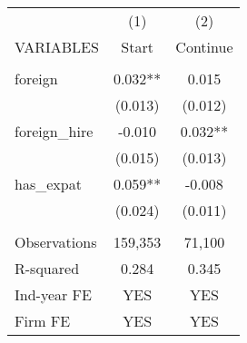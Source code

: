 \begin{tabular}{lcc} \hline
 & (1) & (2) \\
VARIABLES & Start & Continue \\ \hline
 &  &  \\
foreign & 0.032** & 0.015 \\
 & (0.013) & (0.012) \\
foreign\_hire & -0.010 & 0.032** \\
 & (0.015) & (0.013) \\
has\_expat & 0.059** & -0.008 \\
 & (0.024) & (0.011) \\
 &  &  \\
Observations & 159,353 & 71,100 \\
R-squared & 0.284 & 0.345 \\
Ind-year FE & YES & YES \\
 Firm FE & YES & YES \\ \hline
\end{tabular}
